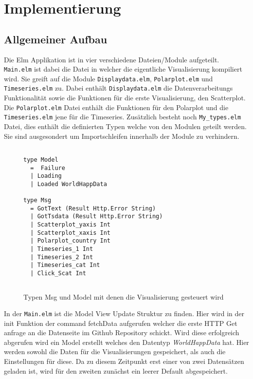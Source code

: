 \section{Implementierung}
\subsection{Allgemeiner Aufbau}
Die Elm Applikation ist in vier verschiedene Dateien/Module aufgeteilt. \texttt{Main.elm} ist dabei die Datei in welcher die eigentliche Visualisierung kompiliert wird. 
Sie greift auf die Module \texttt{Displaydata.elm}, \texttt{Polarplot.elm} und \texttt{Timeseries.elm} zu. 
Dabei enthält \texttt{Displaydata.elm} die Datenverarbeitungs Funktionalität sowie die Funktionen für die erste Visualisierung, den Scatterplot. 
Die \texttt{Polarplot.elm} Datei enthält die Funktionen für den Polarplot 
und die \break \texttt{Timeseries.elm} jene für die Timeseries.  Zusätzlich besteht noch \texttt{My\_types.elm} Datei, dies enthält die definierten Typen welche von den Modulen geteilt werden. Sie sind ausgesondert um Importschleifen innerhalb der Module zu verhindern.\\

\begin{figure}[ht]
\centering
\begin{mdframed}[backgroundcolor=backcolour]
\begin{verbatim}

type Model 
  =  Failure
  | Loading
  | Loaded WorldHappData

type Msg
  = GotText (Result Http.Error String)
  | GotTsdata (Result Http.Error String)
  | Scatterplot_yaxis Int
  | Scatterplot_xaxis Int
  | Polarplot_country Int
  | Timeseries_1 Int
  | Timeseries_2 Int
  | Timeseries_cat Int
  | Click_Scat Int
  
\end{verbatim}
\end{mdframed}
    \caption{Typen Msg und Model mit denen die Visualisierung gesteuert wird}
    \label{fig:Msg_Model}
\end{figure}

In der \texttt{Main.elm} ist die Model View Update Struktur zu finden. 
Hier wird in der init Funktion der command fetchData aufgerufen welcher die erste HTTP Get anfrage an die Datenseite im Github Repository schickt. 
Wird diese erfolgreich abgerufen wird ein Model erstellt welches den Datentyp \textit{WorldHappData} hat. 
Hier werden sowohl die Daten für die Visualisierungen gespeichert, als auch die Einstellungen für diese. Da zu diesem Zeitpunkt erst einer von zwei Datensätzen geladen ist, wird für den zweiten zunächst ein leerer Default abgespeichert. \\

